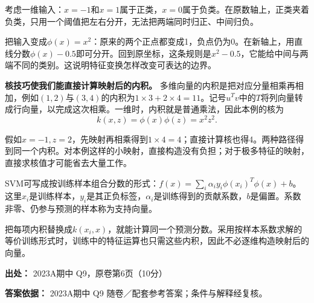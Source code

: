 考虑一维输入：\(x=-1\)和\(x=1\)属于正类，\(x=0\)属于负类。在原数轴上，正类夹着负类，只用一个阈值把左右分开，无法把两端同时归正、中间归负。


把输入变成\(\phi(x)=x^2\)：原来的两个正点都变成1，负点仍为0。在新轴上，用直线分数\(\phi(x)-0.5\)即可分开。回到原坐标，这条规则是\(x^2-0.5\)，它能给中间与两端不同的类别。这说明特征变换怎样改变可表达的边界。




\textbf{核技巧使我们能直接计算映射后的内积。} 多维向量的内积是把对应分量相乘再相加，例如\((1,2)\)与\((3,4)\)的内积为\(1\times3+2\times4=11\)。记号\(u^Tv\)中的\(T\)将列向量转成行向量，以完成这次相乘。一维时，内积就是普通乘法，因此本例的核为
\[
k(x,z)=\phi(x)\phi(z)=x^2z^2.
\]


假如\(x=-1,z=2\)，先映射再相乘得到\(1\times4=4\)；直接计算核也得4。两种路径得到同一个内积。对本例这样的小映射，直接构造没有负担；对于极多特征的映射，直接求核值才可能省去大量工作。


SVM可写成按训练样本组合分数的形式：\(f(x)=\sum_i\alpha_i y_i\phi(x_i)^T\phi(x)+b\)。这里\(x_i\)是训练样本，\(y_i\)是其正负标签，\(\alpha_i\)是训练得到的贡献系数，\(b\)是偏置。系数非零、仍参与预测的样本称为支持向量。


把每项内积替换成\(k(x_i,x)\)，就能计算同一个预测分数。采用按样本系数求解的等价训练形式时，训练中的特征运算也只需这些内积，因此不必逐维构造映射后的向量。


\textbf{出处：} 2023A期中 Q9，原卷第6页（10分）


\textbf{答案依据：} 2023A期中 Q9 随卷／配套参考答案；条件与解释经复核。

